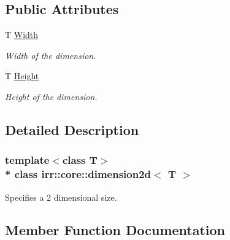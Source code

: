 \subsection*{Public Attributes}
\begin{DoxyCompactItemize}
\item 
T \hyperlink{classirr_1_1core_1_1dimension2d_a0399dcc023c19d381d1a192596107db4}{Width}\hypertarget{classirr_1_1core_1_1dimension2d_a0399dcc023c19d381d1a192596107db4}{}\label{classirr_1_1core_1_1dimension2d_a0399dcc023c19d381d1a192596107db4}

\begin{DoxyCompactList}\small\item\em Width of the dimension. \end{DoxyCompactList}\item 
T \hyperlink{classirr_1_1core_1_1dimension2d_a89b253523d31336c6b2a6a56dfd48a6b}{Height}\hypertarget{classirr_1_1core_1_1dimension2d_a89b253523d31336c6b2a6a56dfd48a6b}{}\label{classirr_1_1core_1_1dimension2d_a89b253523d31336c6b2a6a56dfd48a6b}

\begin{DoxyCompactList}\small\item\em Height of the dimension. \end{DoxyCompactList}\end{DoxyCompactItemize}


\subsection{Detailed Description}
\subsubsection*{template$<$class T$>$\\*
class irr\+::core\+::dimension2d$<$ T $>$}

Specifies a 2 dimensional size. 

\subsection{Member Function Documentation}

